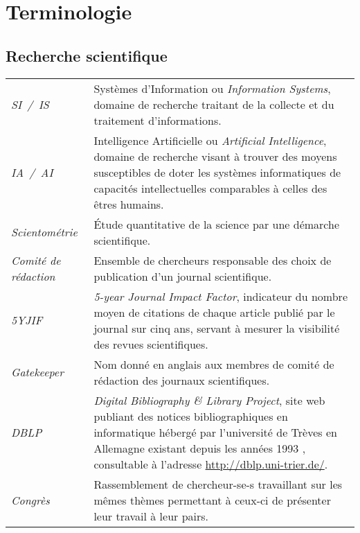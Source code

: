 \cleardoublepage
{}

\chapter{Terminologie}



\section{Recherche scientifique}
	\begin{longtable}{>{\itshape}p{}p{}}
		SI~/~IS			& Systèmes d'Information ou \textit{Information Systems}, domaine de recherche traitant de la collecte et du traitement d\rq{}informations.
		\vspace{2mm}\\
		IA~/~AI			& Intelligence Artificielle ou \textit{Artificial Intelligence}, domaine de recherche visant à trouver des moyens susceptibles de doter les systèmes informatiques de capacités intellectuelles comparables à celles des êtres humains.
		\vspace{2mm}\\
		Scientométrie		& Étude quantitative de la science par une démarche scientifique.
		\vspace{2mm}\\
		Comité de rédaction	& Ensemble de chercheurs responsable des choix de publication d'un journal scientifique.
		\vspace{2mm}\\
		5YJIF			& \textit{5-year Journal Impact Factor}, indicateur du nombre moyen de citations de chaque article publié par le journal sur cinq ans, servant à mesurer la visibilité des revues scientifiques.
		\vspace{2mm}\\
		Gatekeeper	& Nom donné en anglais aux membres de comité de rédaction des journaux scientifiques.
		\vspace{2mm}\\
		DBLP		& \textit{Digital Bibliography \& Library Project}, site web publiant des notices bibliographiques en informatique hébergé par l’université de Trèves en Allemagne existant depuis les années 1993 \citep{ley}, consultable à l'adresse \url{http://dblp.uni-trier.de/}.
		\vspace{2mm}\\
		Congrès	& Rassemblement de chercheur-se-s travaillant sur les mêmes thèmes permettant à ceux-ci de présenter leur travail à leur pairs.

\end{longtable}
